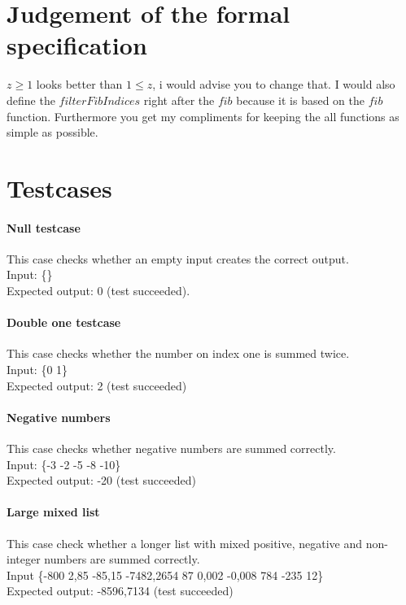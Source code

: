 \documentclass[12pt]{article}
\begin{document}
\section{Judgement of the formal specification}

$z \geq 1$ looks better than $1 \leq z$, i would advise you to change that. I would also define the $filterFibIndices$ right after the $fib$ because it is based on the $fib$ function. Furthermore you get my compliments for keeping the all functions as simple as possible.

\section{Testcases}

\paragraph{Null testcase}
This case checks whether an empty input creates the correct output. \\
Input: \{\} \\
Expected output: 0 (test succeeded).

\paragraph{Double one testcase}
This case checks whether the number on index one is summed twice. \\
Input: \{0 1\} \\
Expected output: 2 (test succeeded)

\paragraph{Negative numbers}
This case checks whether negative numbers are summed correctly. \\
Input: \{-3 -2 -5 -8 -10\} \\
Expected output: -20 (test succeeded)

\paragraph{Large mixed list}
This case check whether a longer list with mixed positive, negative and non-integer numbers are summed correctly. \\
Input \{-800 2,85 -85,15 -7482,2654 87 0,002 -0,008 784 -235 12\} \\
Expected output: -8596,7134 (test succeeded)
\end{document}
